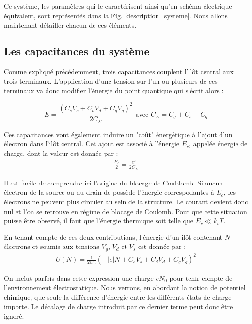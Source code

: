 Ce système, les paramètres qui le caractérisent ainsi qu'un schéma électrique équivalent, sont représentés dans la Fig. \ref{description_systeme}. Nous allons maintenant détailler chacun de ces éléments.


\subsection{Les capacitances du système}
Comme expliqué précédemment, trois capacitances couplent l'il\^ot central aux trois terminaux. L'application d'une tension sur l'un ou plusieurs de ces terminaux va donc modifier l'énergie du point quantique qui s'écrit alors :

\begin{equation}
E = \frac{(C_sV_s + C_dV_d + C_gV_g)^2}{2C_{\Sigma}}
\text{   avec    } 
 C_{\Sigma} = C_g + C_s + C_g \nonumber
\end{equation}




Ces capacitances vont également induire un "co\^ut" énergétique à l'ajout d'un électron dans l'il\^ot central. Cet ajout est associé à l'énergie $E_c$, appelée énergie de charge, dont la valeur est donnée par :
\begin{eqnarray}
\frac{E_c}{2} = \frac{e^2}{2C_{\Sigma}} \nonumber
\end{eqnarray}


Il est facile de comprendre ici l'origine du blocage de Coublomb. Si aucun électron de la source ou du drain de possède l'énergie correspodantes à $E_c$, les électrons ne peuvent plus circuler au sein de la structure. Le courant devient donc nul et l'on se retrouve en régime de blocage de Coulomb. Pour que cette situation puisse être observé, il faut que l'énergie thermique soit telle que $E_c \ll k_bT$.

En tenant compte de ces deux contributions, l'énergie d'un il\^ot contenant $N$ électrons et soumis aux tensions $V_g$, $V_d$ et $V_s$ est donnée par :
\begin{eqnarray}
U(N) = \frac{1}{2C_{\Sigma}} (-|e|N + C_sV_s + C_dV_d + C_gV_g)^2
\end{eqnarray}

On inclut parfois dans cette expression une charge $eN_0$ pour tenir compte de l'environnement électrostatique. Nous verrons, en abordant la notion de potentiel chimique, que seule la différence d'énergie entre les différents états de charge importe. Le décalage de charge introduit par ce dernier terme peut donc \^etre ignoré. \newline


